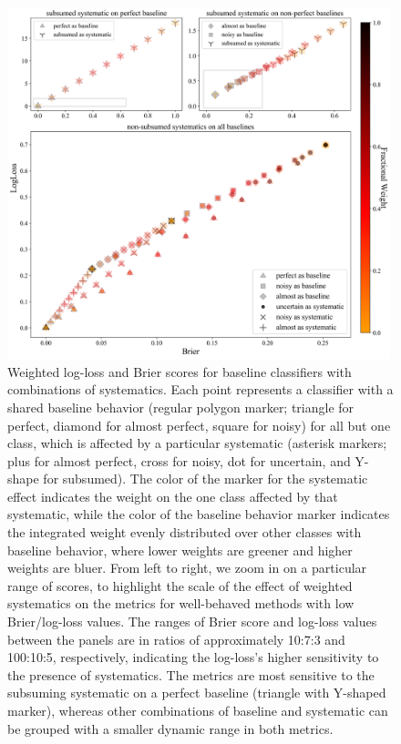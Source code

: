 \begin{figure}
	\begin{center}
		\includegraphics[width=0.99\textwidth]{./fig/multipanel_res.png}
		\caption{
		Weighted log-loss and Brier scores for baseline classifiers with combinations of systematics.
		Each point represents a classifier with a shared baseline behavior (regular polygon marker; triangle for perfect, diamond for almost perfect, square for noisy) for all but one class, which is affected by a particular systematic (asterisk markers; plus for almost perfect, cross for noisy, dot for uncertain, and Y-shape for subsumed).
		The color of the marker for the systematic effect indicates the weight on the one class affected by that systematic, while the color of the baseline behavior marker indicates the integrated weight evenly distributed over other classes with baseline behavior, where lower weights are greener and higher weights are bluer.
		From left to right, we zoom in on a particular range of scores, to highlight the scale of the effect of weighted systematics on the metrics for well-behaved methods with low Brier/log-loss values.
		The ranges of Brier score and log-loss values between the panels are in ratios of approximately 10:7:3 and 100:10:5, respectively, indicating the log-loss's higher sensitivity to the presence of systematics.
		The metrics are most sensitive to the subsuming systematic on a perfect baseline (triangle with Y-shaped marker), whereas other combinations of baseline and systematic can be grouped with a smaller dynamic range in both metrics.
		}
	\end{center}
	\label{fig:all_combined}
\end{figure}

